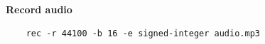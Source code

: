 \documentclass[usenames,dvipsnames, 18pt, compress, aspectratio=169]{beamer}
\begin{document}
\begin{frame}[fragile]{}
    \frametitle{}
    \begin{center}
        \textbf{Record audio}
        \vspace{0.2cm}

        \begin{verbatim}
    rec -r 44100 -b 16 -e signed-integer audio.mp3
        \end{verbatim}

    \end{center}
\end{frame}




\end{document}
